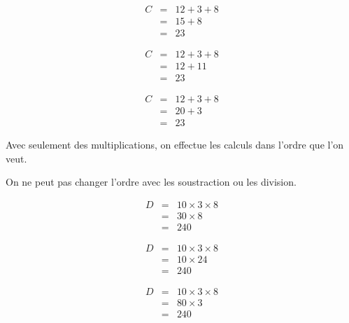 \documentclass[a4paper,10pt]{report}
\begin{document}
\begin{ex} 

\vspace{-1cm} \hspace{2.5cm}
\begin{minipage}{5cm}
\begin{eqnarray*}
C &=& 12 + 3 + 8 \\
&=& 15 + 8 \\
&=& 23
\end{eqnarray*}
\end{minipage}
\begin{minipage}{5cm}
\begin{eqnarray*}
C &=& 12 + 3 + 8 \\
&=& 12 + 11 \\
&=& 23
\end{eqnarray*}
\end{minipage}
\begin{minipage}{5cm}
\begin{eqnarray*}
C &=& 12 + 3 + 8 \\
&=& 20 + 3 \\
&=& 23
\end{eqnarray*}
\end{minipage}
\end{ex}

\begin{memento}
Avec seulement des multiplications, on effectue les calculs dans l'ordre que l'on veut.
\end{memento}

\begin{rem}
On ne peut pas changer l'ordre avec les soustraction ou les division.
\end{rem}

\begin{ex}

\vspace{-1cm} \hspace{2.5cm}
\begin{minipage}{5cm}

\begin{eqnarray*}
D &=& 10 \times 3 \times 8 \\
&=& 30 \times 8 \\
&=& 240
\end{eqnarray*}
\end{minipage}
\begin{minipage}{5cm}
\begin{eqnarray*}
D &=& 10 \times 3 \times 8 \\
&=& 10 \times 24 \\
&=& 240
\end{eqnarray*}
\end{minipage}
\begin{minipage}{5cm}
\begin{eqnarray*}
D &=& 10 \times 3 \times 8 \\
&=& 80 \times 3 \\
&=& 240
\end{eqnarray*}
\end{minipage}
\end{ex}
\end{document}
